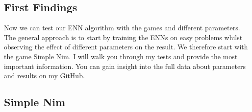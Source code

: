 \documentclass[11pt]{report}
\begin{document}
\begin{enumerate}
    \section{First Findings}\label{sec:first-findings}
    Now we can test our ENN algorithm with the games and different parameters.
    The general approach is to start by training the ENNs on easy problems whilst observing the effect of different parameters on the result.
    We therefore start with the game Simple Nim.
    I will walk you through my tests and provide the most important information.
    You can gain insight into the full data about parameters and results on my GitHub.
            \subsection{Simple Nim}\label{subsec:simple-nim-results}

\end{enumerate}
\end{document}
